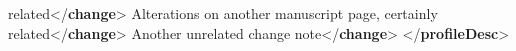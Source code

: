 \begin{shaded}
\hspace*{1em}\hspace*{1em}\hspace*{1em}\hspace*{1em}\hspace*{1em}\hspace*{1em}\hspace*{1em}\hspace*{1em} related{</\textbf{change}>}\mbox{}\newline 
\hspace*{1em}\hspace*{1em}\hspace*{1em}Alterations on another manuscript page, certainly\mbox{}\newline 
\hspace*{1em}\hspace*{1em}\hspace*{1em}\hspace*{1em}\hspace*{1em}\hspace*{1em}\hspace*{1em}\hspace*{1em} related{</\textbf{change}>}\mbox{}\newline 
\hspace*{1em}\hspace*{1em}\mbox{}\newline 
\hspace*{1em}\hspace*{1em}Another unrelated change note{</\textbf{change}>}\mbox{}\newline 
\hspace*{1em}\mbox{}\newline 
{}\mbox{}\newline 
{</\textbf{profileDesc}>}\end{shaded}\egroup\par \par
